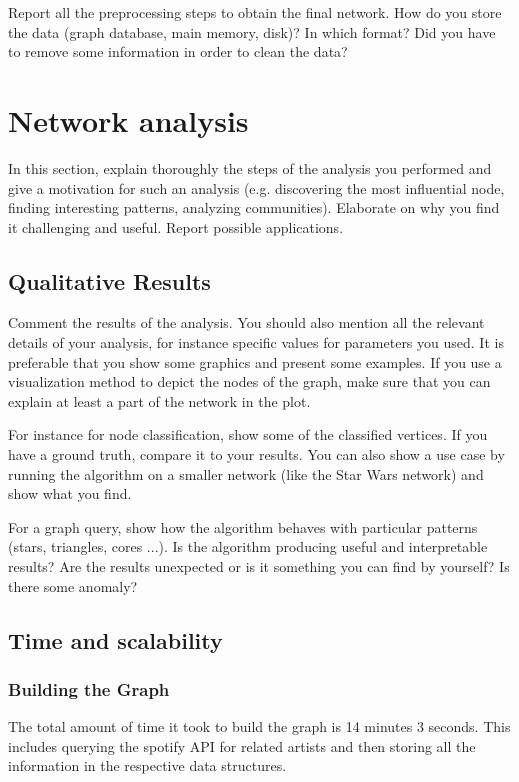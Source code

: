 \documentclass[11pt,a4paper,onecolumn,notitlepage]{article}
\begin{document}
Report all the preprocessing steps to obtain the final network. How do you store the data (graph database, main memory, disk)? In which format? Did you have to remove some information in order to clean the data? 

\section{Network analysis}

In this section, explain thoroughly the steps of the analysis you performed and give a motivation for such an analysis (e.g. discovering the most influential node, finding interesting patterns, analyzing communities). Elaborate on why you find it challenging and useful. Report possible applications.  

\subsection{Qualitative Results}

Comment the results of the analysis. You should also mention all the relevant details of your analysis, for instance specific values for parameters you used. It is preferable that you show some graphics and present some examples. If you use a visualization method to depict the nodes of the graph, make sure that you can explain at least a part of the network in the plot. 

For instance for node classification, show some of the classified vertices. If you have a ground truth, compare it to your results. You can also show a use case by running the algorithm on a smaller network (like the Star Wars network) and show what you find. 

For a graph query, show how the algorithm behaves with particular patterns (stars, triangles, cores ...).  Is the algorithm producing useful and interpretable results? Are the results unexpected or is it something you can find by yourself? Is there some anomaly?

\subsection{Time and scalability}

\subsubsection*{Building the Graph}

The total amount of time it took to build the graph is 14 minutes 3 seconds. This includes querying the spotify API for related artists and then storing all the information in the respective data structures.
\end{document}
